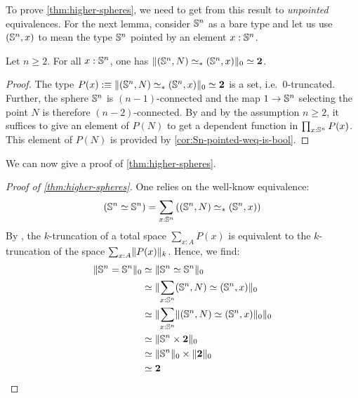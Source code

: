 \documentclass[english,a4]{article}
\newcommand{\ptdweq}{\weq_\ast}%
\newcommand{\setTrunc}[1]{\Trunc{#1}_0}
\begin{document}
To prove \cref{thm:higher-spheres}, we need to get from this result to {\em
    unpointed} equivalences. For the next lemma, consider ${\mathbb S^{n}}$ as a bare type
and let us use $({\mathbb S^{n}},x)$ to mean the type ${\mathbb S^{n}}$ pointed by an element
$x:{\mathbb S^{n}}$.
\begin{lemma}
    Let $n\geq 2$. For all $x:{\mathbb S^{n}}$, one has $\setTrunc{(\Sn n, N) \ptdweq (\Sn n, x)} \simeq \bn 2$.
    \label{lemma:pointed-weq-free-point-codomain-is-bool}
\end{lemma}
\begin{proof}
    The type $P(x) \defequi \setTrunc{(\Sn n, N) \ptdweq (\Sn n, x)} \simeq \bn 2$ is a
    set, i.e.\ $0$-truncated.
    Further, the sphere ${\mathbb S^{n}}$ is $(n-1)$-connected and the map $1\to {\mathbb S^{n}}$ selecting the point $N$ is therefore
    $(n-2)$-connected. 
    By \cite[Lemma 7.5.7]{HoTT} and by the assumption $n \geq 2$,
    it suffices to give an element of $P(N)$ to get a
    dependent function in $\prod_{x:{\mathbb S^{n}}}P(x)$. This element of $P(N)$ is
    provided by \cref{cor:Sn-pointed-weq-is-bool}.
\end{proof}

We can now give a proof of \cref{thm:higher-spheres}.
\begin{proof}[Proof of \cref{thm:higher-spheres}]
    One relies on the well-know equivalence:
    \begin{displaymath}
    (\Sn n \weq \Sn n) = \sum_{x:\Sn n}\left( (\Sn n, N) \ptdweq (\Sn n, x) \right)
    \end{displaymath}
    By \cite[Thm 7.3.9]{HoTT}, the $k$-truncation of a total space
    $\sum_{x:A}P(x)$ is equivalent to the $k$-truncation of the space
    $\sum_{x:A}\lVert P(x)\rVert_k$. Hence, we find:
    \begin{align*}
    \setTrunc{\Sn n = \Sn n} &\weq \setTrunc{\Sn n \weq \Sn n} \\
    &\weq \setTrunc{\sum_{x:\Sn n} (\Sn n, N) \weq (\Sn n, x)} \\
    &\weq \setTrunc{\sum_{x:\Sn n} \setTrunc{(\Sn n, N) \weq (\Sn n, x)}} \\
    &\weq \setTrunc{\Sn n \times \bn 2} \\
    &\weq \setTrunc{\Sn n} \times \setTrunc{\bn 2} \\
    &\weq \bn 2
    \end{align*}
\end{proof}




\end{document}
